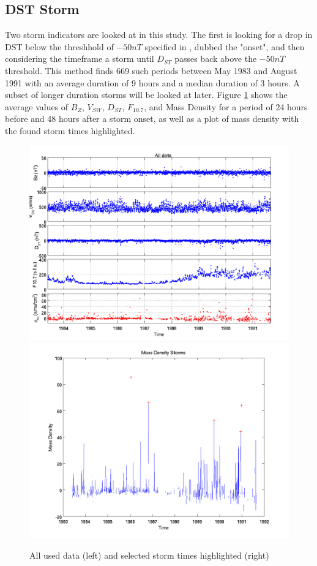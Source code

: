 \documentclass[10pt,twocolumn]{article}
\begin{document}
\subsection{DST Storm}
Two storm indicators are looked at in this study. The first is looking for a drop in DST below the threshhold of $-50nT$ specified in \cite{Takahashi2010}, dubbed the "onset", and then considering the timeframe a storm until $D_{ST}$ passes back above the $-50nT$ threshold. This method finds 669 such periods between May 1983 and August 1991 with an average duration of 9 hours and a median duration of 3 hours. A subset of longer duration storms will be looked at later. Figure \ref{DSTstorm} shows the average values of $B_Z$, $V_{SW}$, $D_{ST}$, $F_{10.7}$, and Mass Density for a period of 24 hours before and 48 hours after a storm onset, as well as a plot of mass density with the found storm times highlighted.

\begin{figure}[htp]
\centering
\includegraphics[scale=0.35]{paperfigures/alldata.png}
\includegraphics[scale=0.35]{paperfigures/massdensitystorms.png}
\caption{All used data (left) and selected storm times highlighted (right)}
\label{DSTstorm}
\end{figure}
\end{document}

